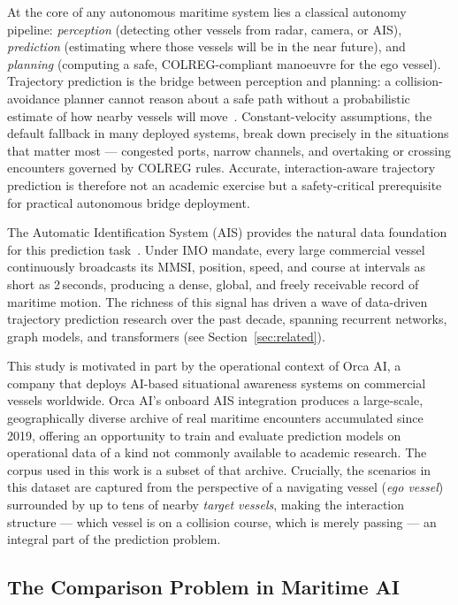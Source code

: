 \documentclass[12pt, a4paper]{article}
\begin{document}
  At the core of any autonomous maritime system lies a classical autonomy pipeline:
  \textit{perception} (detecting other vessels from radar, camera, or AIS),
  \textit{prediction} (estimating where those vessels will be in the near future), and
  \textit{planning} (computing a safe, COLREG-compliant manoeuvre for the ego vessel).
  Trajectory prediction is the bridge between perception and planning: a collision-avoidance
  planner cannot reason about a safe path without a probabilistic estimate of how nearby
  vessels will move~\citep{kuwata2014safe, vagale2021path, mahipala2025colreg}.
  Constant-velocity assumptions, the default fallback in many deployed systems, break down
  precisely in the situations that matter most --- congested ports, narrow channels, and
  overtaking or crossing encounters governed by COLREG rules.  Accurate, interaction-aware
  trajectory prediction is therefore not an academic exercise but a safety-critical
  prerequisite for practical autonomous bridge deployment.

  The Automatic Identification System (AIS) provides the natural data foundation for
  this prediction task~\citep{itu2014ais}.  Under IMO mandate, every large commercial
  vessel continuously broadcasts its MMSI, position, speed, and course at intervals as
  short as 2\,seconds, producing a dense, global, and freely receivable record of maritime
  motion.  The richness of this signal has driven a wave of data-driven trajectory
  prediction research over the past decade, spanning recurrent networks, graph models,
  and transformers (see Section~\ref{sec:related}).

  This study is motivated in part by the operational context of Orca AI, a company that
  deploys AI-based situational awareness systems on commercial vessels worldwide.
  Orca AI's onboard AIS integration produces a large-scale, geographically diverse
  archive of real maritime encounters accumulated since 2019, offering an opportunity
  to train and evaluate prediction models on operational data of a kind not commonly
  available to academic research.  The corpus used in this work is a subset of that
  archive.
  Crucially, the scenarios in this dataset are captured from the perspective of a navigating
  vessel (\textit{ego vessel}) surrounded by up to tens of nearby \textit{target vessels},
  making the interaction structure --- which vessel is on a collision course, which is merely
  passing --- an integral part of the prediction problem.

  \subsection{The Comparison Problem in Maritime AI}
\end{document}
